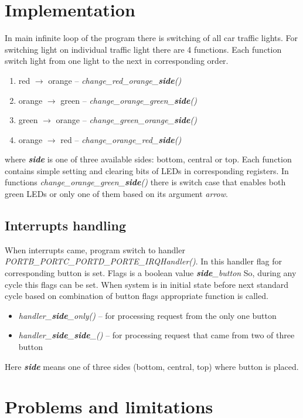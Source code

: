 \documentclass[12pt,a4paper]{article}
\begin{document}
    \section{Implementation}
    In main infinite loop of the program there is switching of all car traffic lights.
    For switching light on individual traffic light there are 4 functions.
    Each function switch light from one light to the next in corresponding order.
    \begin{enumerate}
        \item red $\rightarrow$ orange -- \textit{change\_red\_orange\_\textbf{side}()}
        \item orange $\rightarrow$ green -- \textit{change\_orange\_green\_\textbf{side}()}
        \item green $\rightarrow$ orange -- \textit{change\_green\_orange\_\textbf{side}()}
        \item orange $\rightarrow$ red -- \textit{change\_orange\_red\_\textbf{side}()}
    \end{enumerate}
    where \textit{\textbf{side}} is one of three available sides: bottom, central or top.
    Each function contains simple setting and clearing bits of LEDs in corresponding registers.
    In functions \textit{change\_orange\_green\_\textbf{side}()} there is switch case that enables both green LEDs or only one of them based on its argument \textit{arrow}.
    
    \subsection{Interrupts handling}
    When interrupts came, program switch to handler \textit{PORTB\_PORTC\_PORTD\_PORTE\_IRQHandler()}.
    In this handler flag for corresponding button is set.
    Flags is a boolean value \textit{\textbf{side}\_button}
    So, during any cycle this flags can be set.
    When system is in initial state before next standard cycle based on combination of button flags appropriate function is called.
    \begin{itemize}
        \item \textit{handler\_\textbf{side}\_only()} -- for processing request from the only one button
        \item \textit{handler\_\textbf{side}\_\textbf{side}\_()} -- for processing request that came from two of three button
    \end{itemize}
    \noindent Here \textit{\textbf{side}} means one of three sides (bottom, central, top) where button is placed. 

    \section{Problems and limitations}


    
    
\end{document}
